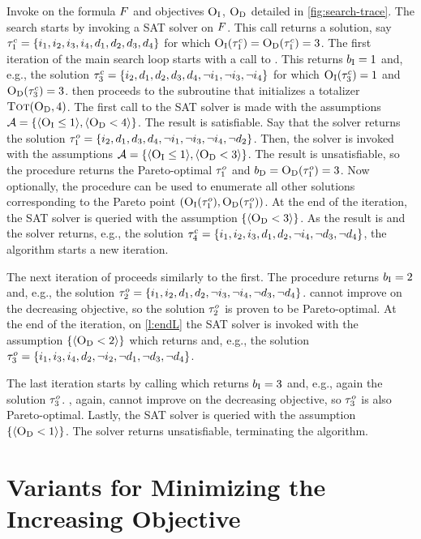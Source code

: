 \begin{example}\label{ex:main-iteration}
  Invoke \algname{} on the formula $F$ and objectives $\textsc{O}_{\text{I}}$, $\textsc{O}_{\text{D}}$ detailed in \cref{fig:search-trace}. 
  The search starts by invoking a SAT solver on $F$.
  This call returns a solution, say $\tau^c_1 = \{i_1,\allowbreak i_2,\allowbreak i_3,\allowbreak i_4,\allowbreak d_1,\allowbreak d_2,\allowbreak d_3,\allowbreak d_4\}$ for which $\textsc{O}_{\text{I}}(\tau^c_1) = \textsc{O}_{\text{D}}(\tau^c_1) = 3$. 
  The first iteration of the main search loop starts with a call to \Min{}.
  This returns $b_{\text{I}} = 1$ and, e.g., the solution $\tau^c_3 = \{i_2,\allowbreak d_1,\allowbreak d_2,\allowbreak d_3,\allowbreak d_4,\allowbreak \lnot i_1,\allowbreak \lnot i_3,\allowbreak \lnot i_4\}$ for which $\textsc{O}_{\text{I}}(\tau^c_3) = 1$ and $\textsc{O}_{\text{D}}(\tau^c_3) = 3$.
  \algname{} then proceeds to the \Simpr{} subroutine that initializes a totalizer $\textsc{Tot}(\textsc{O}_{\text{D}}, 4)$.
  The first call to the SAT solver is made with the assumptions $\mathcal{A} = \{ \langle \textsc{O}_{\text{I}} \leq 1 \rangle, \langle \textsc{O}_{\text{D}} < 4 \rangle \}$.
  The result is satisfiable.
  Say that the solver returns the solution $\tau^o_1 = \{i_2,\allowbreak d_1,\allowbreak d_3,\allowbreak d_4,\allowbreak \lnot i_1,\allowbreak \lnot i_3,\allowbreak \lnot i_4,\allowbreak \lnot d_2\}$.
  Then, the solver is invoked with the assumptions $\mathcal{A} =  \{ \langle \textsc{O}_{\text{I}} \leq 1 \rangle, \langle \textsc{O}_{\text{D}} < 3 \rangle \}$.
  The result is unsatisfiable, so the procedure returns the Pareto-optimal $\tau^o_1$ and $b_{\text{D}} = \textsc{O}_{\text{D}}(\tau^o_1) = 3$.
  Now optionally, the procedure \E{} can be used to enumerate all other solutions corresponding to the Pareto point $(\textsc{O}_{\text{I}}(\tau^o_1),\textsc{O}_{\text{D}}(\tau^o_1))$.
  At the end of the iteration, the SAT solver is queried with the assumption $\{ \langle \textsc{O}_{\text{D}} < 3 \rangle \}$.
  As the result is \sat{} and the solver returns, e.g., the solution $\tau^c_4 = \{i_1,\allowbreak i_2,\allowbreak i_3,\allowbreak d_1,\allowbreak d_2,\allowbreak \lnot i_4,\allowbreak \lnot d_3,\allowbreak \lnot d_4\}$,
  the algorithm starts a new iteration.

  The next iteration of \algname{} proceeds similarly to the first.
  The procedure \Min{} returns $b_{\text{I}} = 2$ and, e.g., the solution $\tau^o_2 = \{i_1,\allowbreak i_2,\allowbreak d_1,\allowbreak d_2,\allowbreak \lnot i_3,\allowbreak \lnot i_4,\allowbreak \lnot d_3,\allowbreak \lnot d_4\}$.
  \Simpr{} cannot improve on the decreasing objective, so the solution $\tau^o_2$ is proven to be Pareto-optimal.
  At the end of the iteration, on \cref{l:endL} the SAT solver is invoked with the assumption $\{\langle \textsc{O}_{\text{D}} < 2 \rangle\}$ which returns \sat{} and, e.g., the solution $\tau^o_3 = \{i_1,\allowbreak i_3,\allowbreak i_4,\allowbreak d_2,\allowbreak \lnot i_2,\allowbreak \lnot d_1,\allowbreak \lnot d_3,\allowbreak \lnot d_4\}$.

  The last iteration starts by calling \Min{} which returns $b_{\text{I}} = 3$ and, e.g., again the solution $\tau^o_3$.
  \Simpr{}, again, cannot improve on the decreasing objective, so $\tau^o_3$ is also Pareto-optimal.
  Lastly, the SAT solver is queried with the assumption $\{\langle \textsc{O}_{\text{D}} < 1 \rangle\}$.
  The solver returns unsatisfiable, terminating the algorithm. 
\end{example}

\section{Variants for Minimizing the Increasing Objective\label{sec:variants}}

